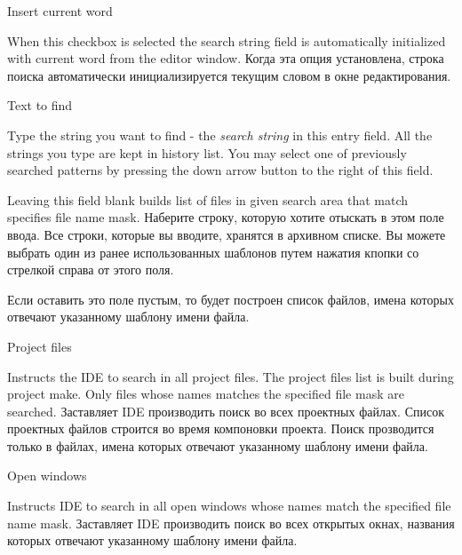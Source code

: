 \begin{popup}
\caption{Insert current word}

\ifenglish
When this checkbox is selected the search string field is automatically
initialized with current word from the editor window.
\else
Когда эта опция установлена, строка поиска автоматически инициализируется 
текущим словом в окне редактирования.
\fi
\end{popup}

\begin{popup}
\caption{Text to find}

\ifenglish
Type the string you want to find - the {\em search string} in this
entry field. All the strings you type are kept in history list. You may select
one of previously searched patterns by pressing the down arrow button to the
right of this field.

Leaving this field blank builds list of files in given search area that match
specifies file name mask.
\else
Наберите строку, которую хотите отыскать в этом поле ввода. Все строки, 
которые вы вводите, хранятся в архивном списке. Вы можете выбрать один из ранее 
использованных шаблонов путем нажатия кпопки со стрелкой справа от этого поля.

Если оставить это поле пустым, то будет построен список файлов, имена которых
отвечают указанному шаблону имени файла.
\fi
\end{popup}

\begin{popup}
\caption{Project files}

\ifenglish
Instructs the IDE to search in all project files. The project files list
is built during project make.  Only files whose names
matches the specified file mask are searched.
\else
Заставляет IDE производить поиск во всех проектных файлах. Список проектных 
файлов строится во время компоновки проекта. Поиск прозводится только в 
файлах, имена которых отвечают указанному шаблону имени файла.
\fi
\end{popup}

\begin{popup}
\caption{Open windows}

\ifenglish
Instructs IDE to search in all open windows whose names match the specified
file name mask.
\else
Заставляет IDE производить поиск во всех открытых окнах, названия которых
отвечают указанному шаблону имени файла.
\fi
\end{popup}

